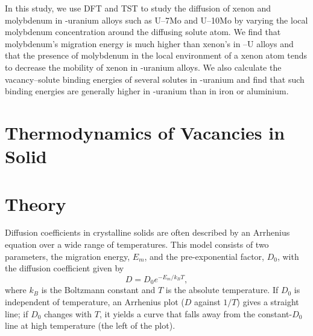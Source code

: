 In this study, we use DFT and TST to study the diffusion of xenon and
molybdenum in \textgamma-uranium alloys such as U--7Mo and U--10Mo by varying the local molybdenum concentration around the diffusing solute atom.
We find that molybdenum's migration energy is much higher than xenon's in
\textgamma--U alloys and that the presence of molybdenum in the local
environment of a xenon atom tends to
decrease the mobility of xenon in \textgamma-uranium alloys.
We also calculate the vacancy--solute binding energies of several solutes
in \textgamma-uranium and find that such binding energies are generally
higher in \textgamma-uranium than in iron or aluminium.

\section{Thermodynamics of Vacancies in Solid}

\section{Theory}\label{sec_theory}
Diffusion coefficients in crystalline solids are often described by an
Arrhenius equation over a wide range of temperatures. This model consists of
two parameters, the migration energy, $E_m$, and the pre-exponential factor,
$D_0$, with the diffusion coefficient given by
\begin{equation}
    D = D_0 e^{-E_m/k_B T},
\end{equation}
where $k_B$ is the Boltzmann constant and $T$ is the absolute temperature.
If $D_0$ is independent of temperature, an Arrhenius plot ($D$ against $1/T$)
gives a straight line; if $D_0$ changes with $T$, it yields a curve that falls
away from the constant-$D_0$ line at high temperature (the left of the plot).

